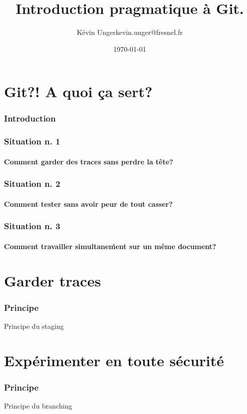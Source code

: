 \documentclass[t]{beamer}
\author{Kévin Unger\newline kevin.unger@fresnel.fr}
\date{\today}
\title{Introduction pragmatique à Git.}
\begin{document}
\section{Git?! A quoi ça sert?}
\frame{\titlepage}
\begin{frame}[label=intro]
        \frametitle{Introduction}
\end{frame}


\begin{frame}[label=sit1]
        \frametitle{Situation n. 1}
        \framesubtitle{Comment garder des traces sans perdre la tête?}
\end{frame}


\begin{frame}[label=sit2]
        \frametitle{Situation n. 2}
        \framesubtitle{Comment tester sans avoir peur de tout casser?}
\end{frame}


\begin{frame}[label=sit3]
        \frametitle{Situation n. 3}
        \framesubtitle{Comment travailler simultane\'ment sur un même document?}
\end{frame}

\section{Garder traces}
\begin{frame}
        \frametitle{Principe}
        Principe du staging
\end{frame}

\section{Exp\'erimenter en toute s\'ecurit\'e}
\begin{frame}
        \frametitle{Principe}
        Principe du branching
\end{frame}
\end{document}
